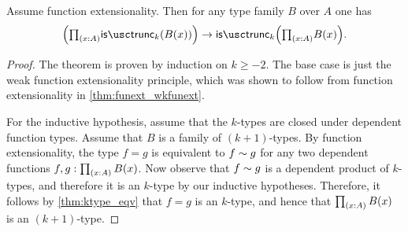 \begin{comment}
\begin{thm}
Assume weak function extensionality. Then for any type $A$, the type $\iscontr(A)$ is a proposition.
\end{thm}

\begin{proof}
Let $A$ be a contractible type with center of contraction $c$, and contraction $C$. We want to show that
\begin{equation*}
\prd{d:A}{D:\prd{x:A}d=x} (c,C)=(d,D).
\end{equation*}
Since $A$ is contractible, we may proceed by singleton induction. Thus, it suffices to show that
\begin{equation*}
\prd{D:\prd{x:A}c=x}(c,C)=(c,D).
\end{equation*}
Now recall from \cref{ex:prop_contr} it follows that for any $x:A$ the type $c=x$ is contractible. By the principle of weak function extensionality it follows that the type $\prd{x:A}c=x$ is contractible. Therefore we may proceed by singleton induction on $D$. It suffices to show that
\begin{equation*}
(c,C)=(c,C),
\end{equation*}
which we have by reflexivity.
\end{proof}
\end{comment}

\begin{thm}\label{thm:trunc_pi}
Assume function extensionality. Then for any type family $B$ over $A$ one has
\begin{equation*}
\Big(\prd{x:A}\istrunc{k}(B(x))\Big)\to \istrunc{k}\Big(\prd{x:A}B(x)\Big).
\end{equation*}
\end{thm}

\begin{proof}
The theorem is proven by induction on $k\geq -2$. The base case is just the weak function extensionality principle, which was shown to follow from function extensionality in \autoref{thm:funext_wkfunext}.

For the inductive hypothesis, assume that the $k$-types are closed under dependent function types. Assume that $B$ is a family of $(k+1)$-types. By function extensionality, the type $f=g$ is equivalent to $f\sim g$ for any two dependent functions $f,g:\prd{x:A}B(x)$. Now observe that $f\sim g$ is a dependent product of $k$-types, and therefore it is an $k$-type by our inductive hypotheses. Therefore, it follows by \autoref{thm:ktype_eqv} that $f=g$ is an $k$-type, and hence that $\prd{x:A}B(x)$ is an $(k+1)$-type.
\end{proof}

